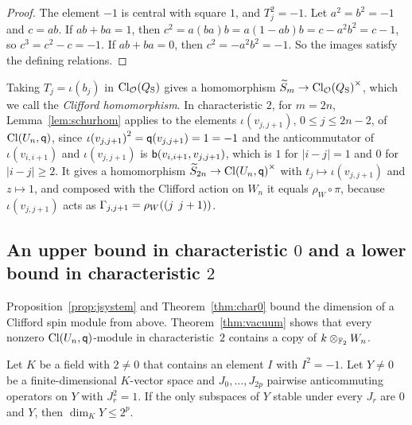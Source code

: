 \begin{proof}
The element $-1$ is central with square $1$, and $T_j^2=-1$. Let $a^2=b^2=-1$ and $c=ab$. If $ab+ba=1$, then $c^2=a(ba)b=a(1-ab)b=c-a^{2}b^2=c-1$, so $c^3=c^2-c=-1$. If $ab+ba=0$, then $c^2=-a^{2}b^2=-1$. So the images satisfy the defining relations.
\end{proof}

Taking $T_j=\iota(b_j)$ in $\operatorname{Cl}_{\mathcal O}(Q_{\mathrm S})$ gives a homomorphism $\widetilde{S}_m\to{\operatorname{Cl}_{\mathcal O}(Q_{\mathrm S})}^\times$, which we call the \emph{Clifford homomorphism}. In characteristic $2$, for $m=2n$, Lemma~\ref{lem:schurhom} applies to the elements $\iota(v_{j,j+1})$, $0\le j\le2n-2$, of $\operatorname{Cl}(U_n,\mathsf{q})$, since ${\iota(v_{j,j+1})}^2=\mathsf{q}(v_{j,j+1})=1=-1$ and the anticommutator of $\iota(v_{i,i+1})$ and $\iota(v_{j,j+1})$ is $\mathsf{b}(v_{i,i+1},v_{j,j+1})$, which is $1$ for $|i-j|=1$ and $0$ for $|i-j|\ge2$. It gives a homomorphism $\widetilde{S}_{2n}\to{\operatorname{Cl}(U_n,\mathsf{q})}^\times$ with $t_j\mapsto\iota(v_{j,j+1})$ and $z\mapsto1$, and composed with the Clifford action on $W_n$ it equals $\rho_W\circ\pi$, because $\iota(v_{j,j+1})$ acts as $\Gamma_{j,j+1}=\rho_W((j\;\,j+1))$.

\subsection{An upper bound in characteristic \texorpdfstring{$0$}{0} and a lower bound in characteristic \texorpdfstring{$2$}{2}}\label{subsec:bounds}

Proposition~\ref{prop:jsystem} and Theorem~\ref{thm:char0} bound the dimension of a Clifford spin module from above. Theorem~\ref{thm:vacuum} shows that every nonzero $\operatorname{Cl}(U_n,\mathsf{q})$-module in characteristic~$2$ contains a copy of $k\otimes_{\mathbb{F}_2}W_n$.

\begin{proposition}\label{prop:jsystem}
Let $K$ be a field with $2\ne0$ that contains an element $I$ with $I^2=-1$. Let $Y\ne0$ be a finite-dimensional $K$-vector space and $J_0,\dots,J_{2p}$ pairwise anticommuting operators on $Y$ with $J_r^2=1$. If the only subspaces of $Y$ stable under every $J_r$ are $0$ and $Y$, then $\dim_{K}Y\le2^p$.
\end{proposition}

